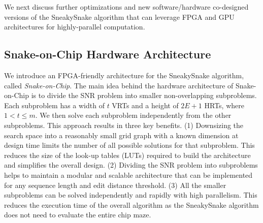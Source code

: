 We next discuss further optimizations and new software/hardware co-designed versions of the SneakySnake algorithm that {can} leverage FPGA and GPU architectures for highly-parallel computation.\\ 

\subsection{Snake-on-Chip Hardware Architecture} \label{Snake-on-Chip-Section}
We introduce an FPGA-friendly architecture for the SneakySnake algorithm, called \emph{Snake-on-Chip}. The main idea behind the hardware architecture of Snake-on-Chip is to divide the SNR problem into smaller non-overlapping subproblems. Each subproblem has a width of $t$ VRTs and a height of $2E+1$ HRTs, where $1<t\leq m$. We then solve each subproblem independently from the other subproblems. This approach results in three key benefits. 
(1) Downsizing the search space into a reasonably small grid graph with a known dimension {at} design time limits the number of all possible solutions for that subproblem. This reduces the size of the look-up tables (LUTs) required to build the architecture and simplifies the overall design. 
(2) Dividing the SNR problem into subproblems helps to maintain a modular and scalable architecture that can be implemented for any sequence length and edit distance threshold. (3) All the smaller subproblems can be solved independently and rapidly {with} high parallelism. This reduces the execution time of the overall algorithm as the SneakySnake algorithm does not need to evaluate the entire chip maze. 

